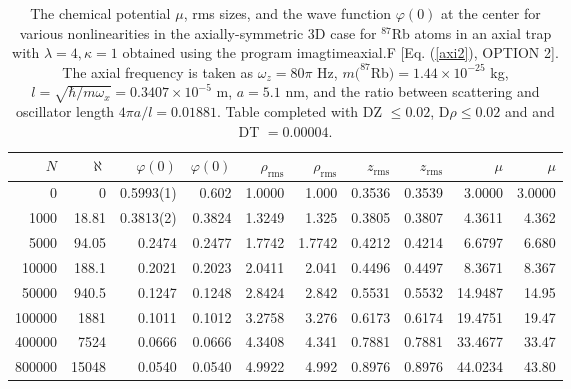 \documentclass[onecolumn]{elsart3p}
\begin{document}
\begin{table}[!ht]
\begin{center}
\caption{The chemical potential $\mu$, rms sizes,
and the wave function
$\varphi(0)$ at the center  for various
nonlinearities in the axially-symmetric  3D case
for $^{87}$Rb atoms in an axial trap
with $\lambda=4,\kappa=1$
obtained using the
program
imagtimeaxial.F [Eq. (\ref{axi2}), OPTION 2]. The axial frequency is
taken as
$\omega_z=80\pi $ Hz,
$m(^{87}$Rb$)=1.44\times 10^{-25}$ kg,
$l=\sqrt{\hbar/m\omega_x}=0.3407\times 10^{-5}$ m, $a=5.1$ nm,
and the ratio between scattering and oscillator length
$4\pi a/l=0.01881$.
Table completed with DZ
$ \le 0.02$, D$\rho \le 0.02$ and
and DT $=0.00004$.}
\label{table6}
\begin{tabular}{|r|r|r|r|r|r|r|r|r|r|}
\hline
$N$        &
${\aleph}$  &
$\varphi(0)$ &
$\varphi(0)$\cite{Bao_Tang} &
$ \rho _{\mathrm{rms}}$  &
$\rho_{\mathrm{rms}}$\cite{Bao_Tang} &
$ z_{\mathrm{rms}}$ &
$  z_{\mathrm{rms}}$\cite{Bao_Tang} &
$\mu $  &$\mu $ \cite{Bao_Tang}\\
\hline
0& 0  &     0.5993(1) &  0.602  & 1.0000 & 1.000 &  0.3536 & 0.3539 &
3.0000  & 3.0000 \\
1000& 18.81  &       0.3813(2)  &0.3824 &1.3249  &1.325 &0.3805 & 0.3807
& 4.3611  & 4.362\\
5000& 94.05  &    0.2474     &0.2477 & 1.7742 &1.7742  &0.4212  &0.4214
& 6.6797  & 6.680 \\
10000& 188.1  &  0.2021       &0.2023 &2.0411 &2.041  & 0.4496  &0.4497
& 8.3671  & 8.367 \\
50000& 940.5  &   0.1247      &0.1248  &2.8424 & 2.842 &0.5531 & 0.5532
& 14.9487  &14.95  \\
100000& 1881  &   0.1011      &0.1012  &3.2758 & 3.276 &0.6173 & 0.6174
&  19.4751 & 19.47 \\
400000& 7524  &  0.0666       & 0.0666 &4.3408 &4.341  &0.7881 & 0.7881
& 33.4677  & 33.47 \\
800000& 15048  &      0.0540   & 0.0540 &4.9922 &4.992  & 0.8976 &
0.8976
& 44.0234  & 43.80 \\
\hline
\end{tabular}
\end{center}
\end{table}
\end{document}
